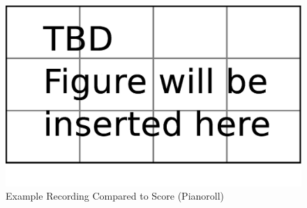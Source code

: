 \begin{figure}[tp]
   \begin{center}
      \includegraphics[width=\textwidth]{fig/TBDFigure}

   \end{center}
   \caption{Example Recording Compared to Score (Pianoroll)}
   \label{fig:exprecording}
\end{figure}

